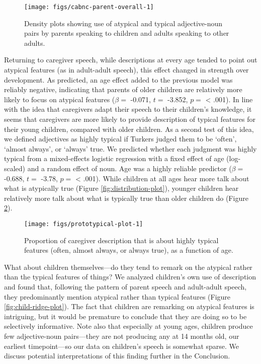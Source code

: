 \documentclass{ucetd}
\begin{document}
\begin{figure}[tb]

{\centering \texttt{[image: figs/cabnc-parent-overall-1]} 

}

\caption{Density plots showing use of atypical and typical adjective-noun pairs by parents speaking to children and adults speaking to other adults.}\label{fig:cabnc-parent-overall}
\end{figure}

Returning to caregiver speech, while descriptions at every age tended to
point out atypical features (as in adult-adult speech), this effect
changed in strength over development. As predicted, an age effect added
to the previous model was reliably negative, indicating that parents of
older children are relatively more likely to focus on atypical features
(\(\beta =\) -0.071, \(t =\) -3.852, \(p =\) \textless{} .001). In line
with the idea that caregivers adapt their speech to their children's
knowledge, it seems that caregivers are more likely to provide
description of typical features for their young children, compared with
older children. As a second test of this idea, we defined adjectives as
highly typical if Turkers judged them to be `often', `almost always', or
`always' true. We predicted whether each judgment was highly typical
from a mixed-effects logistic regression with a fixed effect of age
(log-scaled) and a random effect of noun. Age was a highly reliable
predictor (\(\beta =\) -0.688, \(t =\) -3.78, \(p =\) \textless{} .001).
While children at all ages hear more talk about what is atypically true
(Figure \ref{fig:distribution-plot}), younger children hear relatively
more talk about what is typically true than older children do (Figure
\ref{fig:prototypical-plot}).

\begin{figure}[!tb]

{\centering \texttt{[image: figs/prototypical-plot-1]} 

}

\caption{Proportion of caregiver description that is about highly typical features (often, almost always, or always true), as a function of age.}\label{fig:prototypical-plot}
\end{figure}

What about children themselves---do they tend to remark on the atypical
rather than the typical features of things? We analyzed children's own
use of description and found that, following the pattern of parent
speech and adult-adult speech, they predominantly mention atypical
rather than typical features (Figure \ref{fig:child-ridge-plot}). The
fact that children are remarking on atypical features is intriguing, but
it would be premature to conclude that they are doing so to be
selectively informative. Note also that especially at young ages,
children produce few adjective-noun pairs---they are not producing any
at 14 months old, our earliest timepoint---so our data on children's
speech is somewhat sparse. We discuss potential interpretations of this
finding further in the Conclusion.
\end{document}
